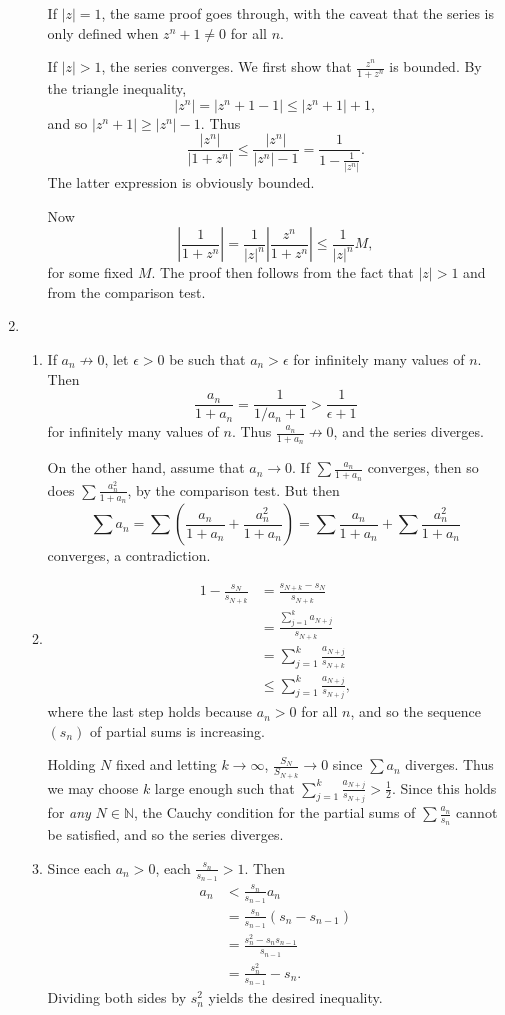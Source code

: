 \documentclass{article}
\begin{document}
\begin{enumerate}[label=\textbf{\arabic*.}]
\begin{enumerate}
If $|z| = 1$, the same proof goes through, with the caveat that the series is only defined when $z^n + 1 \neq 0$ for all $n$.

If $|z| > 1$, the series converges. We first show that $\frac{z^n}{1+z^n}$ is bounded. By the triangle inequality, \[|z^n| = |z^n + 1 - 1| \leq |z^n + 1| + 1,\] and so $|z^n + 1| \geq |z^n| - 1$. Thus \[\frac{|z^n|}{|1+z^n|} \leq \frac{|z^n|}{|z^n| - 1} = \frac{1}{1 - \frac{1}{|z^n|}}.\] The latter expression is obviously bounded.

Now \[\left|\frac{1}{1+z^n}\right| = \frac{1}{|z|^n}\left|\frac{z^n}{1+z^n}\right| \leq \frac{1}{|z|^n} M,\] for some fixed $M$. The proof then follows from the fact that $|z| > 1$ and from the comparison test.
\end{enumerate}
\setcounter{enumi}{10}
\item \begin{enumerate}
\item If $a_n\not\to 0$, let $\epsilon > 0$ be such that $a_n > \epsilon$ for infinitely many values of $n$. Then \[\frac{a_n}{1+a_n} = \frac{1}{1/a_n+1} > \frac{1}{\epsilon+1}\] for infinitely many values of $n$. Thus $\frac{a_n}{1+a_n}\not\to 0$, and the series diverges.

On the other hand, assume that $a_n\to 0$. If $\sum\frac{a_n}{1+a_n}$ converges, then so does $\sum\frac{a_n^2}{1+a_n}$, by the comparison test. But then \[\sum a_n = \sum\left(\frac{a_n}{1+a_n} + \frac{a_n^2}{1+a_n}\right) = \sum\frac{a_n}{1+a_n} + \sum\frac{a_n^2}{1+a_n}\] converges, a contradiction.
\item \begin{align*}
1 - \frac{s_N}{s_{N+k}} &= \frac{s_{N+k}-s_N}{s_{N+k}}\\
	&= \frac{\sum_{j=1}^k a_{N+j}}{s_{N+k}}\\
	&= \sum_{j=1}^k \frac{a_{N+j}}{s_{N+k}}\\
	&\leq \sum_{j=1}^k \frac{a_{N+j}}{s_{N+j}},
\end{align*}
where the last step holds because $a_n > 0$ for all $n$, and so the sequence $(s_n)$ of partial sums is increasing.

Holding $N$ fixed and letting $k\to\infty$, $\frac{S_N}{S_{N+k}}\to 0$ since $\sum a_n$ diverges. Thus we may choose $k$ large enough such that $\sum_{j=1}^k \frac{a_{N+j}}{s_{N+j}} > \frac{1}{2}$. Since this holds for \textit{any} $N\in\mathbb N$, the Cauchy condition for the partial sums of $\sum \frac{a_n}{s_n}$ cannot be satisfied, and so the series diverges.
\item Since each $a_n > 0$, each $\frac{s_n}{s_{n-1}} > 1$. Then
\begin{align*}
a_n &< \frac{s_n}{s_{n-1}} a_n\\
	&= \frac{s_n}{s_{n-1}}(s_n - s_{n-1})\\
	&= \frac{s_n^2 - s_n s_{n-1}}{s_{n-1}}\\
	&= \frac{s_n^2}{s_{n-1}} - s_n.
\end{align*}
Dividing both sides by $s_n^2$ yields the desired inequality.


\end{enumerate}
\end{enumerate}
\end{document}
